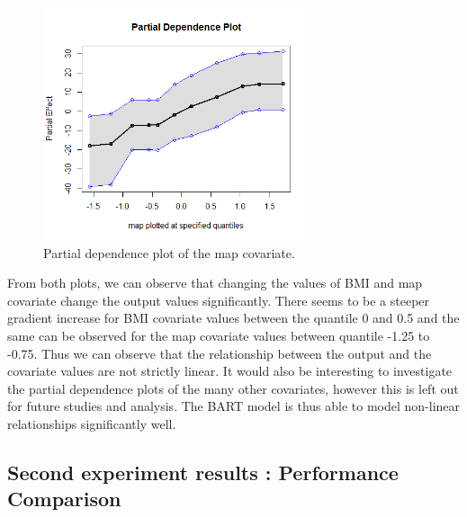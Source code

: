 \documentclass{usiinftr}
\begin{document}
\begin{figure}[h!] 
\centering
\includegraphics[width=0.7\textwidth]{images/PD_map.png}
\caption{Partial dependence plot of the map covariate.}
\label{PDmap}
\end{figure}

From both plots, we can observe that changing the values of BMI and map covariate change the output values significantly. There seems to be a steeper gradient increase for BMI covariate values between the quantile 0 and 0.5 and the same can be observed for the map covariate values between quantile -1.25 to -0.75. Thus we can observe that the relationship between the output and the covariate values are not strictly linear. It would also be interesting to investigate the partial dependence plots of the many other covariates, however this is left out for future  studies and analysis. The BART model is thus able to model non-linear relationships significantly well. 

\subsection{Second experiment results : Performance Comparison}
\end{document}
